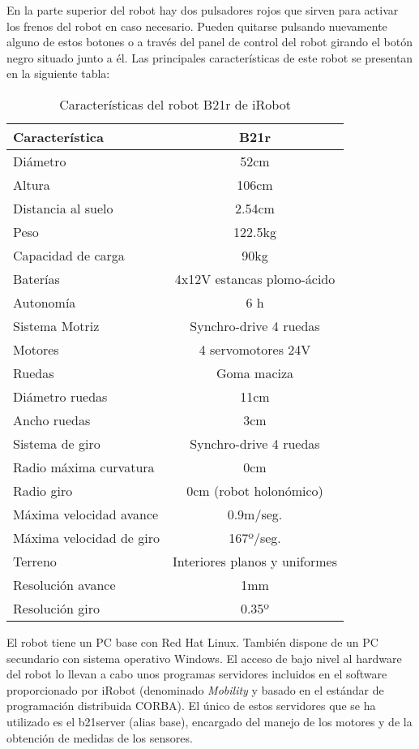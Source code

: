 En la parte superior del robot hay dos pulsadores rojos que sirven para activar los frenos del robot en caso necesario. Pueden quitarse pulsando nuevamente alguno de estos botones o a través del panel de control del robot girando el botón negro situado junto a él.
Las principales características de este robot se presentan en la siguiente tabla:
\begin{table}[h]
\begin{center}
\begin{tabular}{|l|c|} \hline
Característica & B21r\\
\hline
\hline
Diámetro & 52cm\\
\hline
Altura & 106cm\\
\hline
Distancia al suelo & 2.54cm\\
\hline
Peso & 122.5kg\\
\hline
Capacidad de carga & 90kg\\
\hline
Baterías & 4x12V estancas plomo-ácido\\
\hline
\hline
Autonomía & 6 h\\
\hline
Sistema Motriz & Synchro-drive 4 ruedas\\
\hline
Motores & 4 servomotores 24V\\
\hline
Ruedas & Goma maciza\\
\hline
\hline
Diámetro ruedas & 11cm\\
\hline
Ancho ruedas & 3cm\\
\hline
Sistema de giro & Synchro-drive 4 ruedas\\
\hline
Radio máxima curvatura & 0cm\\
\hline
Radio giro & 0cm (robot holonómico)\\
\hline
\hline
Máxima velocidad avance & 0.9m/seg.\\
\hline
Máxima velocidad de giro & 167º/seg.\\
\hline
Terreno & Interiores planos y uniformes\\
\hline
Resolución avance & 1mm\\
\hline
Resolución giro & 0.35º\\
\hline
\end{tabular}
\end{center}
\caption{Características del robot B21r de iRobot}
\end{table}

El robot tiene un PC base con Red Hat Linux. También dispone de un PC secundario con sistema operativo Windows. El acceso de bajo nivel al hardware del robot lo llevan a cabo unos programas servidores incluidos en el software proporcionado por iRobot (denominado \emph{Mobility} y basado en el estándar de programación distribuida CORBA). El único de estos servidores que se ha utilizado es el b21server (alias base), encargado del manejo de los motores y de la obtención de medidas de los sensores.

